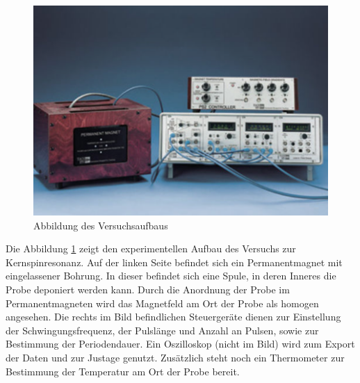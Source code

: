\begin{figure}[H]
  \centering
  \includegraphics[scale=0.5]{resources/aufbau.png}
  \caption{Abbildung des Versuchsaufbaus \cite{skizze}}
  \label{fig:aufbau}
\end{figure}
\noindent Die Abbildung \ref{fig:aufbau} zeigt den experimentellen Aufbau des
Versuchs zur Kernspinresonanz. Auf der linken Seite befindet sich ein
Permanentmagnet mit eingelassener Bohrung. In dieser befindet sich eine Spule,
in deren Inneres die Probe deponiert werden kann. Durch die Anordnung der Probe
im Permanentmagneten wird das Magnetfeld am Ort der Probe als homogen angesehen.
Die rechts im Bild befindlichen Steuergeräte dienen zur Einstellung der
Schwingungsfrequenz, der Pulslänge und Anzahl an Pulsen, sowie zur Bestimmung
der Periodendauer. Ein Oszilloskop (nicht im Bild) wird zum Export der
Daten und zur Justage genutzt. Zusätzlich steht noch ein Thermometer zur
Bestimmung der Temperatur am Ort der Probe bereit. 

